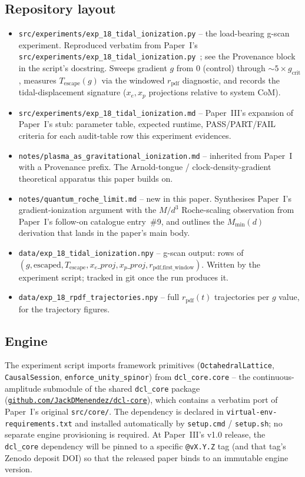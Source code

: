 \label{sec:code_and_data}

\subsection{Repository layout}

\begin{itemize}
\item \texttt{src/experiments/exp\_18\_tidal\_ionization.py}
  -- the load-bearing g-scan experiment.  Reproduced verbatim from
  Paper~I's
  \texttt{src/experiments/exp\_18\_tidal\_ionization.py}~\cite{menendez2026geometry};
  see the Provenance block in the script's docstring.  Sweeps
  gradient $g$ from $0$ (control) through $\sim\!5\times
  g_\text{crit}$, measures $T_\text{escape}(g)$ via the windowed
  $r_\text{pdf}$ diagnostic, and records the tidal-displacement
  signature ($x_e, x_p$ projections relative to system CoM).
\item \texttt{src/experiments/exp\_18\_tidal\_ionization.md} --
  Paper~III's expansion of Paper~I's stub: parameter table, expected
  runtime, PASS/PART/FAIL criteria for each audit-table row this
  experiment evidences.
\item \texttt{notes/plasma\_as\_gravitational\_ionization.md} --
  inherited from Paper~I with a Provenance prefix.  The
  Arnold-tongue / clock-density-gradient theoretical apparatus this
  paper builds on.
\item \texttt{notes/quantum\_roche\_limit.md} -- new in this paper.
  Synthesises Paper~I's gradient-ionization argument with the $M/d^3$
  Roche-scaling observation from Paper~I's follow-on catalogue
  entry~\#9, and outlines the $M_\text{min}(d)$ derivation that lands
  in the paper's main body.
\item \texttt{data/exp\_18\_tidal\_ionization.npy} -- g-scan output:
  rows of $(g, \text{escaped}, T_\text{escape}, x_e\_proj,
  x_p\_proj, r_\text{pdf,first\_window})$.  Written by the
  experiment script; tracked in git once the run produces it.
\item \texttt{data/exp\_18\_rpdf\_trajectories.npy} -- full
  $r_\text{pdf}(t)$ trajectories per $g$ value, for the trajectory
  figures.
\end{itemize}

\subsection{Engine}

The experiment script imports framework primitives
(\texttt{OctahedralLattice}, \texttt{CausalSession},
\texttt{enforce\_unity\_spinor}) from \texttt{dcl\_core.core} --
the continuous-amplitude submodule of the shared \texttt{dcl\_core}
package
(\href{https://github.com/JackDMenendez/dcl-core}{\nolinkurl{github.com/JackDMenendez/dcl-core}}),
which contains a verbatim port of Paper~I's
original \texttt{src/core/}.  The dependency is declared in
\texttt{virtual-env-requirements.txt} and installed automatically
by \texttt{setup.cmd} / \texttt{setup.sh}; no separate engine
provisioning is required.  At Paper~III's v1.0 release, the
\texttt{dcl\_core} dependency will be pinned to a specific
\texttt{@vX.Y.Z} tag (and that tag's Zenodo deposit DOI) so that
the released paper binds to an immutable engine version.
